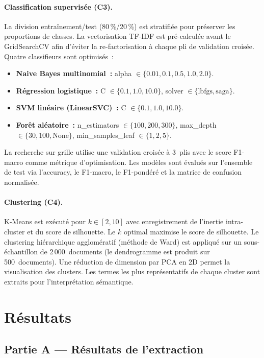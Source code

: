\documentclass[11pt, a4paper, oneside]{article}
\begin{document}
\paragraph{Classification supervisée (C3).} La division entraînement/test (80\,\%/20\,\%) est stratifiée pour préserver les proportions de classes. La vectorisation TF-IDF est pré-calculée avant le GridSearchCV afin d'éviter la re-factorisation à chaque pli de validation croisée. Quatre classifieurs sont optimisés~:
\begin{itemize}[noitemsep]
  \item \textbf{Naive Bayes multinomial~:} alpha $\in \{0.01, 0.1, 0.5, 1.0, 2.0\}$.
  \item \textbf{Régression logistique~:} C $\in \{0.1, 1.0, 10.0\}$, solver $\in \{\text{lbfgs}, \text{saga}\}$.
  \item \textbf{SVM linéaire (LinearSVC)~:} C $\in \{0.1, 1.0, 10.0\}$.
  \item \textbf{Forêt aléatoire~:} n\_estimators $\in \{100, 200, 300\}$, max\_depth $\in \{30, 100, \text{None}\}$, min\_samples\_leaf $\in \{1, 2, 5\}$.
\end{itemize}
La recherche sur grille utilise une validation croisée à 3~plis avec le score F1-macro comme métrique d'optimisation. Les modèles sont évalués sur l'ensemble de test via l'accuracy, le F1-macro, le F1-pondéré et la matrice de confusion normalisée.

\paragraph{Clustering (C4).} K-Means est exécuté pour $k \in [2, 10]$ avec enregistrement de l'inertie intra-cluster et du score de silhouette. Le $k$ optimal maximise le score de silhouette. Le clustering hiérarchique agglomératif (méthode de Ward) est appliqué sur un sous-échantillon de 2\,000~documents (le dendrogramme est produit sur 500~documents). Une réduction de dimension par PCA en 2D permet la visualisation des clusters. Les termes les plus représentatifs de chaque cluster sont extraits pour l'interprétation sémantique.

\section{Résultats}

\subsection{Partie A — Résultats de l'extraction}
\end{document}
